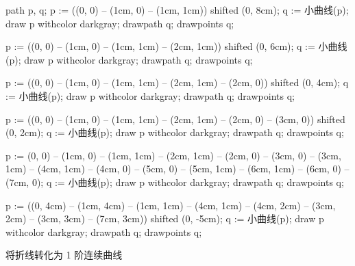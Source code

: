 \usemodule[zhfonts]

path p, q;
p := ((0, 0) -- (1cm, 0) -- (1cm, 1cm)) shifted (0, 8cm);
q := 小曲线(p); draw p withcolor darkgray; drawpath q; drawpoints q;

p := ((0, 0) -- (1cm, 0) -- (1cm, 1cm) -- (2cm, 1cm)) shifted (0, 6cm);
q := 小曲线(p); draw p withcolor darkgray; drawpath q; drawpoints q;

p := ((0, 0) -- (1cm, 0) -- (1cm, 1cm) -- (2cm, 1cm) -- (2cm, 0)) shifted (0, 4cm);
q := 小曲线(p); draw p withcolor darkgray; drawpath q; drawpoints q;

p := ((0, 0) -- (1cm, 0) -- (1cm, 1cm) -- (2cm, 1cm) -- (2cm, 0) -- (3cm, 0)) shifted (0, 2cm);
q := 小曲线(p); draw p withcolor darkgray; drawpath q; drawpoints q;

p := (0, 0) -- (1cm, 0) -- (1cm, 1cm) -- (2cm, 1cm) -- (2cm, 0) -- (3cm, 0) -- (3cm, 1cm) -- (4cm, 1cm) -- (4cm, 0) -- (5cm, 0) -- (5cm, 1cm) -- (6cm, 1cm) -- (6cm, 0) -- (7cm, 0);
q := 小曲线(p); draw p withcolor darkgray; drawpath q; drawpoints q;

p := ((0, 4cm) -- (1cm, 4cm) -- (1cm, 1cm) -- (4cm, 1cm) 
  -- (4cm, 2cm) -- (3cm, 2cm) -- (3cm, 3cm) -- (7cm, 3cm)) shifted (0, -5cm);
q := 小曲线(p); draw p withcolor darkgray; drawpath q; drawpoints q;
\stopuseMPgraphic

\startTEXpage[offset=4pt]
将折线转化为 1 阶连续曲线
\blank
{}
\stopTEXpage
